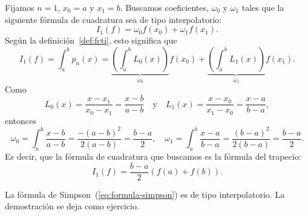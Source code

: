 \begin{example}
  \label{ex:formula-trapecio-interpol}
  Fijamos $n=1$, $x_0=a$ y $x_1=b$. Buscamos coeficientes, $\omega_0$
  y $\omega_1$ tales que la siguiente fórmula de cuadratura sea de
  tipo interpolatorio:
  \begin{equation*}
    I_1(f)=\omega_0 f(x_0) + \omega_1 f(x_1).
  \end{equation*}
  Según la definición~\ref{def:fcti}, esto significa que
  \begin{equation*}
    I_1(f)=\int_a^b p_n(x)=
    \underbrace{\left(\int_a^bL_0(x)\right)}_{\omega_0} f(x_0)+
    \underbrace{\left(\int_a^bL_1(x)\right)}_{\omega_1} f(x_1).
  \end{equation*}
  Como
  \begin{equation*}
    L_0(x)=\frac{x-x_1}{x_0-x_1}=\frac{x-b}{a-b} \quad \text{y} \quad
    L_1(x)=\frac{x-x_0}{x_1-x_0}=\frac{x-a}{b-a},
  \end{equation*}
  entonces
  \begin{equation*}
    \omega_0 = \int_a^b \frac{x-b}{a-b} = \frac{-(a-b)^2}{2(a-b)}=\frac{b-a}{2},
    \quad
    \omega_1 = \int_a^b \frac{x-a}{b-a} = \frac{(b-a)^2}{2(b-a)}=\frac{b-a}{2}.
  \end{equation*}
  Es decir, que la fórmula de cuadratura que buscamos es la
  fórmula del trapecio:
  \begin{equation*}
    I_1(f)=\frac{b-a}{2}
    \left(
      f(a)+f(b)
    \right).
  \end{equation*}
\end{example}

\begin{example}
  La fórmula de Simpson~(\ref{eq:formula-simpson}) es de tipo
  interpolatorio. La demostración se deja como ejercicio.
\end{example}

